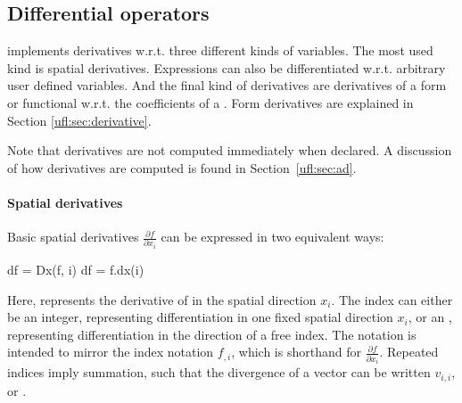 \subsection{Differential operators} \label{ufl:sec:differential}
\index{$\nabla$}

\ufl{} implements derivatives w.r.t. three different kinds of variables.
The most used kind is spatial derivatives.  Expressions can also be
differentiated w.r.t. arbitrary user defined variables.  And the final
kind of derivatives are derivatives of a form or functional w.r.t. the
coefficients of a .  Form derivatives are explained in
Section \ref{ufl:sec:derivative}.

Note that derivatives are not computed immediately when declared.  A
discussion of how derivatives are computed is found in
Section~\ref{ufl:sec:ad}.

\paragraph{Spatial derivatives}
\label{ufl:sec:dx}

Basic spatial derivatives $\frac{\partial f}{\partial x_i}$ can be
expressed in two equivalent ways:
\begin{code}
df = Dx(f, i)
df = f.dx(i)
\end{code}
Here,  represents the derivative of  in the spatial
direction $x_i$. The index  can either be an integer,
representing differentiation in one fixed spatial direction $x_i$, or
an , representing differentiation in the direction of a
free index.  The notation  is intended to mirror the
index notation $f_{,i}$, which is shorthand for $\frac{\partial
f}{\partial x_i}$.  Repeated indices imply summation, such that the
divergence of a vector can be written $v_{i,i}$, or
.

